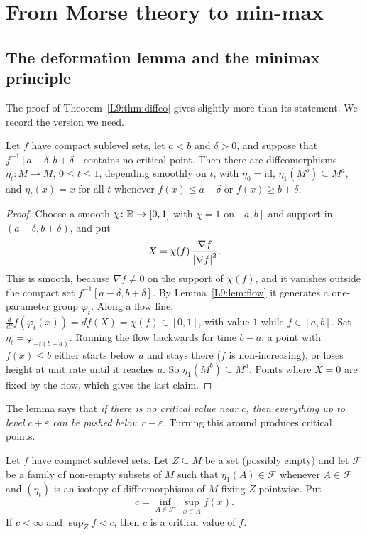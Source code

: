 \section{From Morse theory to min-max}
\label{TOP:sec:minmax}

\subsection{The deformation lemma and the minimax principle}

The proof of Theorem~\ref{L9:thm:diffeo} gives slightly more than its statement. We record the
version we need.

\begin{lemma}\label{TOP:lem:deform}
Let $f$ have compact sublevel sets, let $a<b$ and $\delta>0$, and suppose that $f^{-1}[a-\delta,b+\delta]$
contains no critical point. Then there are diffeomorphisms $\eta_t\colon M\to M$, $0\le t\le1$,
depending smoothly on $t$, with $\eta_0=\mathrm{id}$, $\eta_1(M^b)\subseteq M^a$, and $\eta_t(x)=x$
for all $t$ whenever $f(x)\le a-\delta$ or $f(x)\ge b+\delta$.
\end{lemma}

\begin{proof}
Choose a smooth $\chi\colon\mathbb{R}\to[0,1]$ with $\chi=1$ on $[a,b]$ and support in $(a-\delta,b+\delta)$, and
put
\[
  X=\chi(f)\,\frac{\nabla f}{\left\lvert \nabla f \right\rvert^2}.
\]
This is smooth, because $\nabla f\neq0$ on the support of $\chi(f)$, and it vanishes outside the compact set
$f^{-1}[a-\delta,b+\delta]$. By Lemma~\ref{L9:lem:flow} it generates a one-parameter group $\varphi_t$. Along
a flow line, $\frac{d}{dt}f(\varphi_t(x))=df(X)=\chi(f)\in[0,1]$, with value $1$ while $f\in[a,b]$. Set
$\eta_t=\varphi_{-t(b-a)}$. Running the flow backwards for time $b-a$, a point with $f(x)\le b$ either
starts below $a$ and stays there ($f$ is non-increasing), or loses height at unit rate until it reaches
$a$. So $\eta_1(M^b)\subseteq M^a$. Points where $X=0$ are fixed by the flow, which gives the last claim.
\end{proof}

The lemma says that \emph{if there is no critical value near $c$, then everything up to level $c+\varepsilon$
can be pushed below $c-\varepsilon$.} Turning this around produces critical points.

\begin{theorem}\label{TOP:thm:minimax}
Let $f$ have compact sublevel sets. Let $Z\subseteq M$ be a set (possibly empty) and let $\mathcal F$ be a
family of non-empty subsets of $M$ such that $\eta_1(A)\in\mathcal F$ whenever $A\in\mathcal F$ and
$(\eta_t)$ is an isotopy of diffeomorphisms of $M$ fixing $Z$ pointwise. Put
\[
  c=\inf_{A\in\mathcal F}\ \sup_{x\in A}f(x).
\]
If $c<\infty$ and $\sup_Zf<c$, then $c$ is a critical value of $f$.
\end{theorem}

